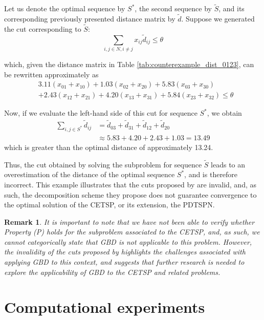 \documentclass[pdflatex,sn-mathphys-num]{sn-jnl}%
\newtheorem*{remark}{Remark}
\begin{document}
Let us denote the optimal sequence by $S^*$, the second sequence by $\tilde{S}$, and its corresponding previously presented distance matrix by $\tilde{d}$. Suppose we generated the cut corresponding to $\tilde{S}$:
\begin{equation}
    \sum_{i,j \in N, i \neq j} x_{ij} \tilde{d}_{ij} \leq \theta
\end{equation}

which, given the distance matrix in Table \ref{tab:counterexample_dist_0123}, can be rewritten approximately as
\begin{equation}
\begin{aligned}
&3.11(x_{01} + x_{10}) + 1.03(x_{02} + x_{20}) + 5.83(x_{03} + x_{30}) \\
&+ 2.43(x_{12} + x_{21}) + 4.20(x_{13} + x_{31}) + 5.84(x_{23} + x_{32})
\leq \theta
\end{aligned}
\end{equation}

Now, if we evaluate the left-hand side of this cut for sequence $S^*$, we obtain
\begin{align*}
    \sum_{i,j \in S^*} \tilde{d}_{ij} &= \tilde{d}_{03} + \tilde{d}_{31} + \tilde{d}_{12} + \tilde{d}_{20}\\
    &\approx 5.83 + 4.20 + 2.43 + 1.03 = 13.49 
\end{align*}
which is greater than the optimal distance of approximately 13.24.

Thus, the cut obtained by solving the subproblem for sequence $\tilde{S}$ leads to an overestimation of the distance of the optimal sequence $S^*$, and is therefore incorrect. This example illustrates that the cuts proposed by \citet{walteros} are invalid, and, as such, the decomposition scheme they propose does not guarantee convergence to the optimal solution of the CETSP, or its extension, the PDTSPN.

\begin{remark}
It is important to note that we have not been able to verify whether Property (P) holds for the subproblem associated to the CETSP, and, as such, we cannot categorically state that GBD is not applicable to this problem. However, the invalidity of the cuts proposed by \citet{walteros} highlights the challenges associated with applying GBD to this context, and suggests that further research is needed to explore the applicability of GBD to the CETSP and related problems.
\end{remark}


\section{Computational experiments}\label{sec7}
\end{document}
